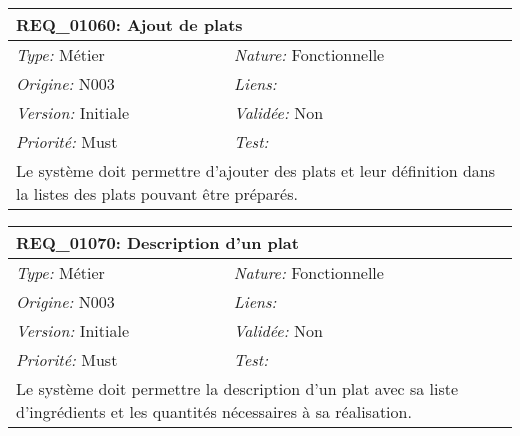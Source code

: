 \begin{table}[!h]

\begin{tabular}{|p{60mm}p{100mm}|}

\hline

\multicolumn{2}{|l|}{\textbf{REQ\_01060:} Ajout de plats} \\ \hline

\emph{Type:} Métier & \emph{Nature:} Fonctionnelle \\

\emph{Origine:} N003 & \emph{Liens:}  \\

\emph{Version:} Initiale & \emph{Validée:} Non \\

\emph{Priorité:} Must & \emph{Test:} \\ \hline

\multicolumn{2}{|p{16cm}|}{Le système doit permettre d'ajouter des plats et leur définition dans la listes des plats pouvant être préparés.} \\ \hline

\end{tabular}

\end{table}



\begin{table}[!h]

\begin{tabular}{|p{60mm}p{100mm}|}

\hline

\multicolumn{2}{|l|}{\textbf{REQ\_01070:} Description d'un plat} \\ \hline

\emph{Type:} Métier & \emph{Nature:} Fonctionnelle \\

\emph{Origine:} N003 & \emph{Liens:}  \\

\emph{Version:} Initiale & \emph{Validée:} Non \\

\emph{Priorité:} Must & \emph{Test:} \\ \hline

\multicolumn{2}{|p{16cm}|}{Le système doit permettre la description d'un plat avec sa liste d'ingrédients et les quantités nécessaires à sa réalisation.} \\ \hline

\end{tabular}

\end{table}



